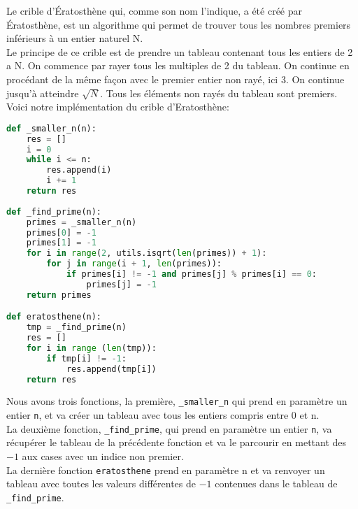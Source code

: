 Le crible d'Ératosthène qui, comme son nom l'indique, a été créé par Ératosthène, est un algorithme qui permet de trouver tous les nombres premiers inférieurs à un entier naturel N. \\
        
Le principe de ce crible est de prendre un tableau contenant tous les entiers de 2 a N.
On commence par rayer tous les multiples de 2 du tableau. 
On continue en procédant de la même façon avec le premier entier non rayé, ici 3. On continue jusqu'à atteindre $\sqrt{N}$. Tous les éléments non rayés du tableau sont premiers.\\

Voici notre implémentation du crible d'Eratosthène:
\begin{lstlisting}[language=Python]
def _smaller_n(n): 
	res = []
	i = 0
	while i <= n:
		res.append(i)
		i += 1
	return res
    
def _find_prime(n): 
    primes = _smaller_n(n)
    primes[0] = -1
    primes[1] = -1
    for i in range(2, utils.isqrt(len(primes)) + 1): 
        for j in range(i + 1, len(primes)): 
            if primes[i] != -1 and primes[j] % primes[i] == 0: 
                primes[j] = -1
    return primes

def eratosthene(n):
    tmp = _find_prime(n)
    res = []
    for i in range (len(tmp)): 
        if tmp[i] != -1: 
            res.append(tmp[i])
    return res
\end{lstlisting}
\vspace{1em}

Nous avons trois fonctions, la première, \lstinline{_smaller_n} qui prend en paramètre un entier \lstinline{n}, et va créer un tableau avec tous les entiers compris entre 0 et n. \\
La deuxième fonction, \lstinline{_find_prime}, qui prend en paramètre un entier \lstinline{n}, va récupérer le tableau de la précédente fonction et va le parcourir en mettant des $-1$ aux cases avec un indice non premier. \\
La dernière fonction \lstinline{eratosthene} prend en paramètre n et va renvoyer un tableau avec toutes les valeurs différentes de $-1$ contenues dans le tableau de \lstinline{_find_prime}. \\

